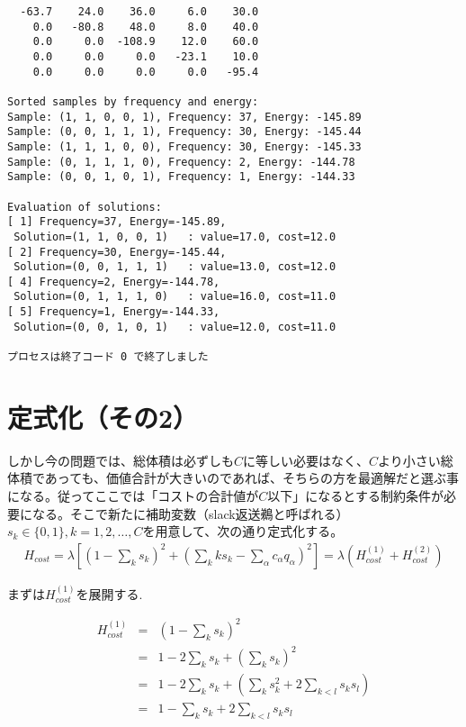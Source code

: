 \documentclass[uplatex,dvipdfmx,a4paper,11pt,oneside,openany]{jsbook}
\begin{document}
\begin{verbatim}
  -63.7    24.0    36.0     6.0    30.0
    0.0   -80.8    48.0     8.0    40.0
    0.0     0.0  -108.9    12.0    60.0
    0.0     0.0     0.0   -23.1    10.0
    0.0     0.0     0.0     0.0   -95.4

Sorted samples by frequency and energy:
Sample: (1, 1, 0, 0, 1), Frequency: 37, Energy: -145.89
Sample: (0, 0, 1, 1, 1), Frequency: 30, Energy: -145.44
Sample: (1, 1, 1, 0, 0), Frequency: 30, Energy: -145.33
Sample: (0, 1, 1, 1, 0), Frequency: 2, Energy: -144.78
Sample: (0, 0, 1, 0, 1), Frequency: 1, Energy: -144.33

Evaluation of solutions:
[ 1] Frequency=37, Energy=-145.89,
 Solution=(1, 1, 0, 0, 1)	: value=17.0, cost=12.0
[ 2] Frequency=30, Energy=-145.44,
 Solution=(0, 0, 1, 1, 1)	: value=13.0, cost=12.0
[ 4] Frequency=2, Energy=-144.78,
 Solution=(0, 1, 1, 1, 0)	: value=16.0, cost=11.0
[ 5] Frequency=1, Energy=-144.33,
 Solution=(0, 0, 1, 0, 1)	: value=12.0, cost=11.0

プロセスは終了コード 0 で終了しました
\end{verbatim}

\section{定式化（その2）}

しかし今の問題では、総体積は必ずしも$C$に等しい必要はなく、$C$より小さい総体積であっても、価値合計が大きいのであれば、そちらの方を最適解だと選ぶ事になる。従ってここでは「コストの合計値が$C$以下」になるとする制約条件が必要になる。そこで新たに補助変数（slack返送鵜と呼ばれる）$s_k \in \{0, 1\}, k=1,2,\dots,C$を用意して、次の通り定式化する。
\begin{eqnarray}
  H_{cost} = \lambda \left[\left(1-\sum_k s_k\right)^2+\left(\sum_k ks_k - \sum_\alpha c_\alpha q_\alpha\right)^2\right] = \lambda\left(H_{cost}^{(1)} + H_{cost}^{(2)}\right)
\end{eqnarray}

まずは$H_{cost}^{(1)}$を展開する.

\begin{eqnarray*}
H_{cost}^{(1)}&=&\left(1-\sum_k s_k\right)^2\\
&=&1-2\sum_k s_k + \left(\sum_k s_k\right)^2\\
&=&1-2\sum_k s_k + \left(\sum_k s_k^2 + 2\sum_{k<l}s_k s_l\right)\\
&=&1-\sum_k s_k + 2\sum_{k<l}s_k s_l
\end{eqnarray*}
\end{document}
